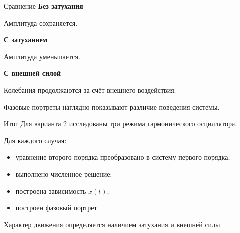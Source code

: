 \documentclass[
  ignorenonframetext,
  aspectratio=169,
  russian,
]{beamer}
\providecommand{\tightlist}{%
  \setlength{\itemsep}{0pt}\setlength{\parskip}{0pt}}
\begin{document}
\begin{frame}{Сравнение}
\protect{}\label{ux441ux440ux430ux432ux43dux435ux43dux438ux435}
\textbf{Без затухания}

Амплитуда сохраняется.

\textbf{С затуханием}

Амплитуда уменьшается.

\textbf{С внешней силой}

Колебания продолжаются за счёт внешнего воздействия.

Фазовые портреты наглядно показывают различие поведения системы.
\end{frame}

\begin{frame}{Итог}
\protect{}\label{ux438ux442ux43eux433}
Для варианта 2 исследованы три режима гармонического осциллятора.

Для каждого случая:

\begin{itemize}
\tightlist
\item
  уравнение второго порядка преобразовано в систему первого порядка;
\item
  выполнено численное решение;
\item
  построена зависимость \(x(t)\);
\item
  построен фазовый портрет.
\end{itemize}

Характер движения определяется наличием затухания и внешней силы.
\end{frame}
\end{document}
